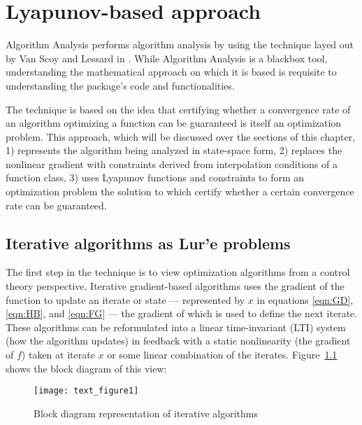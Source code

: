 \chapter{Lyapunov-based approach}\label{chapter:lyapunov}

Algorithm Analysis performs algorithm analysis by using the technique layed out by Van Scoy and Lessard in \cite{tutorial}. While Algorithm Analysis is a blackbox tool, understanding the mathematical approach on which it is based is requisite to understanding the package's code and functionalities.

The technique is based on the idea that certifying whether a convergence rate of an algorithm optimizing a function can be guaranteed is itself an optimization problem. This approach, which will be discussed over the sections of this chapter, 1) represents the algorithm being analyzed in state-space form, 2) replaces the nonlinear gradient with constraints derived from interpolation conditions of a function class, 3) uses Lyapunov functions and constraints to form an optimization problem the solution to which certify whether a certain convergence rate can be guaranteed.
\section{Iterative algorithms as Lur'e problems}

The first step in the technique is to view optimization algorithms from a control theory perspective. Iterative gradient-based algorithms uses the gradient of the function to update an iterate or state --- represented by $x$ in equations \eqref{eqn:GD}, \eqref{eqn:HB}, and \eqref{eqn:FG} --- the gradient of which is used to define the next iterate. These algorithms can be reformulated into a linear time-invariant (LTI) system (how the algorithm updates) in feedback with a static nonlinearity (the gradient of \(f\)) taken at iterate \(x\) or some linear combination of the iterates. Figure~\ref{plot_block_diagram} shows the block diagram of this view:
\begin{figure}[h]
    \centering
	\texttt{[image: text\_figure1]}
    \caption{Block diagram representation of iterative algorithms}
    \label{plot_block_diagram}
\end{figure}

